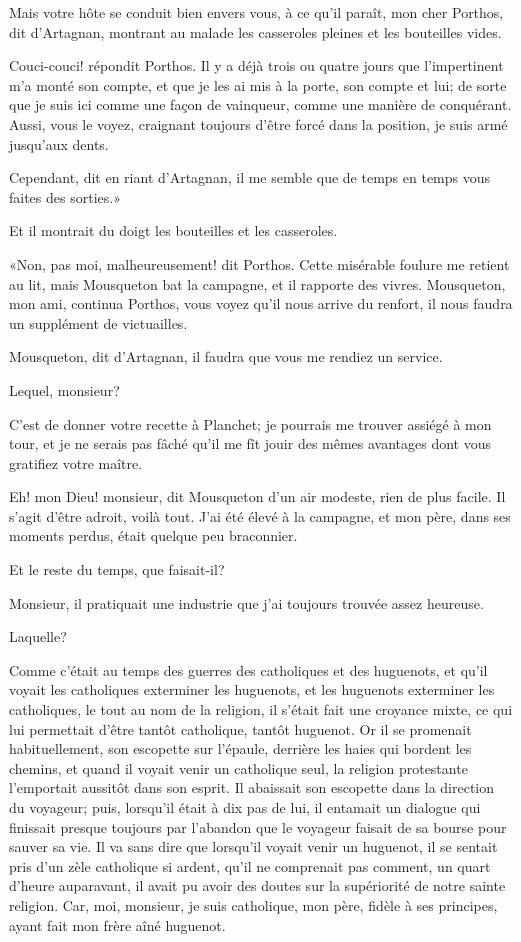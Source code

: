 \speak  Mais votre hôte se conduit bien envers vous, à ce qu'il paraît, mon cher Porthos, dit d'Artagnan, montrant au malade les casseroles pleines et les bouteilles vides. 

\speak  Couci-couci! répondit Porthos. Il y a déjà trois ou quatre jours que l'impertinent m'a monté son compte, et que je les ai mis à la porte, son compte et lui; de sorte que je suis ici comme une façon de vainqueur, comme une manière de conquérant. Aussi, vous le voyez, craignant toujours d'être forcé dans la position, je suis armé jusqu'aux dents. 

\speak  Cependant, dit en riant d'Artagnan, il me semble que de temps en temps vous faites des sorties.» 

Et il montrait du doigt les bouteilles et les casseroles. 

«Non, pas moi, malheureusement! dit Porthos. Cette misérable foulure me retient au lit, mais Mousqueton bat la campagne, et il rapporte des vivres. Mousqueton, mon ami, continua Porthos, vous voyez qu'il nous arrive du renfort, il nous faudra un supplément de victuailles. 

\speak  Mousqueton, dit d'Artagnan, il faudra que vous me rendiez un service. 

\speak  Lequel, monsieur? 

\speak  C'est de donner votre recette à Planchet; je pourrais me trouver assiégé à mon tour, et je ne serais pas fâché qu'il me fît jouir des mêmes avantages dont vous gratifiez votre maître. 

\speak  Eh! mon Dieu! monsieur, dit Mousqueton d'un air modeste, rien de plus facile. Il s'agit d'être adroit, voilà tout. J'ai été élevé à la campagne, et mon père, dans ses moments perdus, était quelque peu braconnier. 

\speak  Et le reste du temps, que faisait-il? 

\speak  Monsieur, il pratiquait une industrie que j'ai toujours trouvée assez heureuse. 

\speak  Laquelle? 

\speak  Comme c'était au temps des guerres des catholiques et des huguenots, et qu'il voyait les catholiques exterminer les huguenots, et les huguenots exterminer les catholiques, le tout au nom de la religion, il s'était fait une croyance mixte, ce qui lui permettait d'être tantôt catholique, tantôt huguenot. Or il se promenait habituellement, son escopette sur l'épaule, derrière les haies qui bordent les chemins, et quand il voyait venir un catholique seul, la religion protestante l'emportait aussitôt dans son esprit. Il abaissait son escopette dans la direction du voyageur; puis, lorsqu'il était à dix pas de lui, il entamait un dialogue qui finissait presque toujours par l'abandon que le voyageur faisait de sa bourse pour sauver sa vie. Il va sans dire que lorsqu'il voyait venir un huguenot, il se sentait pris d'un zèle catholique si ardent, qu'il ne comprenait pas comment, un quart d'heure auparavant, il avait pu avoir des doutes sur la supériorité de notre sainte religion. Car, moi, monsieur, je suis catholique, mon père, fidèle à ses principes, ayant fait mon frère aîné huguenot. 


